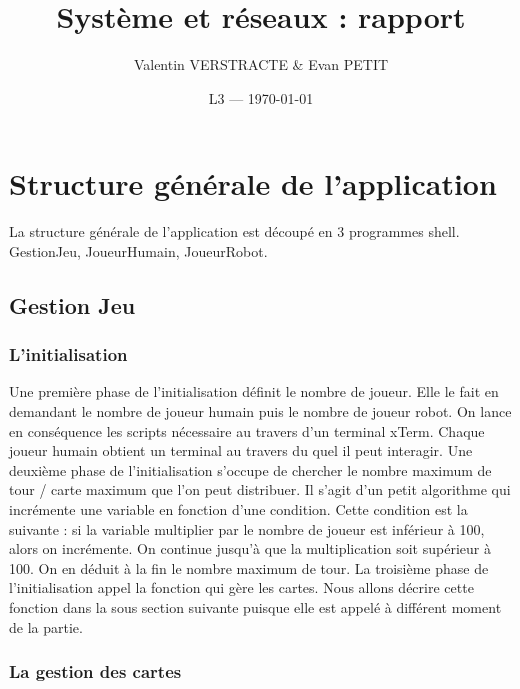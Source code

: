 \documentclass{article}
\title{Système et réseaux : rapport} %
\author{Valentin VERSTRACTE \& Evan PETIT}
\date{L3 --- \today} %
\begin{document}
\maketitle %



\section{Structure générale de l'application}
La structure générale de l'application est découpé en 3 programmes shell. GestionJeu, JoueurHumain, JoueurRobot.

\subsection{Gestion Jeu}
\subsubsection{L'initialisation}

Une première phase de l'initialisation définit le nombre de joueur. Elle le fait en demandant le nombre de joueur humain puis le nombre de joueur robot. On lance en conséquence les scripts nécessaire au travers d'un terminal xTerm. Chaque joueur humain obtient un terminal au travers du quel il peut interagir.
\newline
\newline
Une deuxième phase de l'initialisation s'occupe de chercher le nombre maximum de tour / carte maximum que l'on peut distribuer. Il s'agit d'un petit algorithme qui incrémente une variable en fonction d'une condition. Cette condition est la suivante : si la variable multiplier par le nombre de joueur est inférieur à 100, alors on incrémente. On continue jusqu'à que la multiplication soit supérieur à 100. On en déduit à la fin le nombre maximum de tour.
\newline
\newline
La troisième phase de l'initialisation appel la fonction qui gère les cartes. Nous allons décrire cette fonction dans la sous section suivante puisque elle est appelé à différent moment de la partie.  

\subsubsection{La gestion des cartes}
\end{document}
